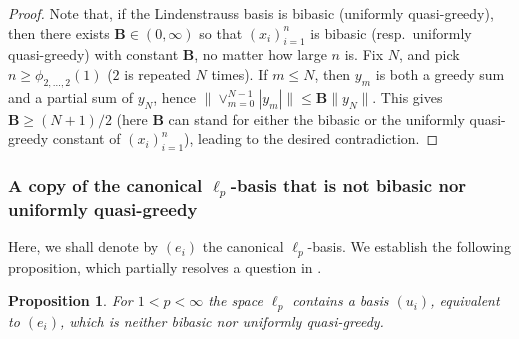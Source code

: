 \documentclass[12pt,leqno]{amsart}
\newtheorem{proposition}[theorem]{Proposition}
\numberwithin{equation}{section}
\theoremstyle{definition}
\begin{document}
\begin{proof}
 Note that, if the Lindenstrauss basis is bibasic (uniformly quasi-greedy), then there exists ${\mathbf{B}} \in (0,\infty)$ so that $(x_i)_{i=1}^n$ is bibasic (resp.~uniformly quasi-greedy) with constant ${\mathbf{B}}$, no matter how large $n$ is.
Fix $N$, and pick $n \geq \phi_{2,\ldots,2}(1)$ ($2$ is repeated $N$ times).
If $m \leq N$, then $y_m$ is both a greedy sum and a partial sum of $y_N$, hence $\| \vee_{m=0}^{N-1} |y_m| \| \leq {\mathbf{B}} \|y_N\|$. This gives ${\mathbf{B}} \geq(N+1)/2$ (here ${\mathbf{B}}$ can stand for either the bibasic or the uniformly quasi-greedy constant of $(x_i)_{i=1}^n$), leading to the desired contradiction.
\end{proof}





\subsubsection{A copy of the canonical \texorpdfstring{$\ell_p$}{}-basis that is not bibasic nor uniformly quasi-greedy}\label{ss:destroy_lp}
Here, we shall denote by $(e_i)$ the canonical $\ell_p$-basis. We establish the following proposition, which partially resolves a question in \cite[Remark 7.6]{OTTT}.

\begin{proposition}\label{p:destroy_lp}
 For $1 < p < \infty$ the space $\ell_p$ contains a basis $(u_i)$, equivalent to $(e_i)$,  which is neither bibasic nor uniformly quasi-greedy.
\end{proposition}
\end{document}

